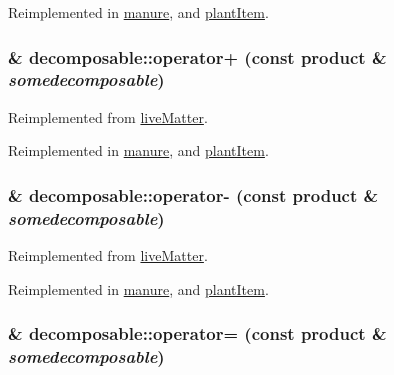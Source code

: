 Reimplemented in \hyperlink{classmanure_ac45a5d29b499ebe4f93a8473dc2cf821}{manure}, and \hyperlink{classplant_item_a68b971164b0ea870d6d14c5b53ad8223}{plantItem}.\hypertarget{classdecomposable_a3ce2092217848b27b52fc54327c8ad53}{
\subsubsection[{operator+}]{ \& decomposable::operator+ (const {\bf product} \& {\em somedecomposable})}}
\label{classdecomposable_a3ce2092217848b27b52fc54327c8ad53}


Reimplemented from \hyperlink{classlive_matter_ae7a333e94f166a448a4b8f8b70ebe9fe}{liveMatter}.

Reimplemented in \hyperlink{classmanure_a021351fd3857778590b48842dfd8fd5f}{manure}, and \hyperlink{classplant_item_aee9a9da7f6a40551ff0e172561d6a881}{plantItem}.\hypertarget{classdecomposable_a2af3d9d773f8cdf8d84ce51ed5c470ff}{
\subsubsection[{operator-\/}]{ \& decomposable::operator-\/ (const {\bf product} \& {\em somedecomposable})}}
\label{classdecomposable_a2af3d9d773f8cdf8d84ce51ed5c470ff}


Reimplemented from \hyperlink{classlive_matter_a6b8311a516ba78a7caacc80a28ec143e}{liveMatter}.

Reimplemented in \hyperlink{classmanure_a78dc3bbc39591aeb4ac6b3b722d66a0d}{manure}, and \hyperlink{classplant_item_a3ca74628fd07b229a871ac0f80e31a41}{plantItem}.\hypertarget{classdecomposable_a296f63c98dd6712bfc375287c6123ea7}{
\subsubsection[{operator=}]{ \& decomposable::operator= (const {\bf product} \& {\em somedecomposable})}}
\label{classdecomposable_a296f63c98dd6712bfc375287c6123ea7}


